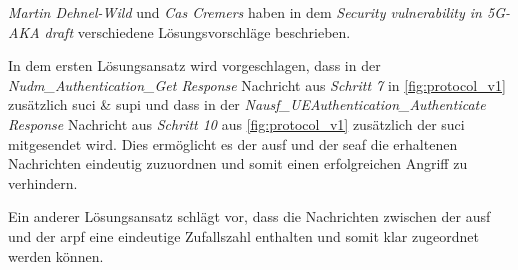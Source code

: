 \textit{Martin Dehnel-Wild} und \textit{Cas Cremers} haben in dem \textit{Security vulnerability in 5G-AKA draft} verschiedene Lösungsvorschläge beschrieben.

In dem ersten Lösungsansatz wird vorgeschlagen, dass in der \textit{Nudm\_Authentication\_Get Response} Nachricht aus \textit{Schritt 7} in \cref{fig:protocol_v1} zusätzlich \gls{suci} \& \gls{supi} und dass in der \textit{Nausf\_UEAuthentication\_Authenticate Response} Nachricht aus \textit{Schritt 10} aus \cref{fig:protocol_v1} zusätzlich der \gls{suci} mitgesendet wird.
Dies ermöglicht es der \gls{ausf} und der \gls{seaf} die erhaltenen Nachrichten eindeutig zuzuordnen und somit einen erfolgreichen Angriff zu verhindern.

Ein anderer Lösungsansatz schlägt vor, dass die Nachrichten zwischen der \gls{ausf} und der \gls{arpf} eine eindeutige Zufallszahl enthalten und somit klar zugeordnet werden können.






